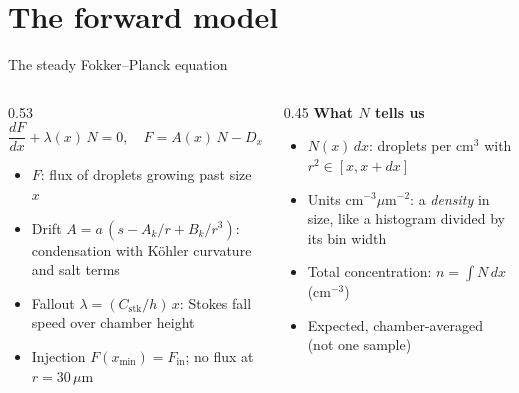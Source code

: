 \documentclass[aspectratio=169,10pt]{beamer}
\newcommand{\um}{\,\mu\mathrm{m}}
\newcommand{\Fin}{F_{\mathrm{in}}}
\newcommand{\Cstk}{C_{\mathrm{stk}}}
\begin{document}
\section{The forward model}

\begin{frame}{The steady Fokker--Planck equation}
\begin{columns}[T]
\begin{column}{0.53\textwidth}
\[
\boxed{\frac{dF}{dx} + \lambda(x)\,N = 0,\quad F = A(x)\,N - D_x\,\frac{dN}{dx}}
\]
\begin{itemize}\small
\item $F$: flux of droplets growing past size $x$
\item Drift $A = a\,(s - A_k/r + B_k/r^3)$: condensation with Köhler curvature and salt terms
\item Fallout $\lambda = (\Cstk/h)\,x$: Stokes fall speed over chamber height
\item Injection $F(x_{\min}) = \Fin$; no flux at $r = 30\um$
\end{itemize}
\end{column}
\begin{column}{0.45\textwidth}
\textbf{What $N$ tells us}
\begin{itemize}\small
\item $N(x)\,dx$: droplets per cm$^3$ with $r^2\in[x, x+dx]$
\item Units cm$^{-3}\mu$m$^{-2}$: a \emph{density} in size, like a histogram divided by its bin width
\item Total concentration: $n = \int N\,dx$ (cm$^{-3}$)
\item Expected, chamber-averaged (not one sample)
\end{itemize}
\end{column}
\end{columns}
\vspace{0.1em}
\centering
{}
\end{frame}
\end{document}
